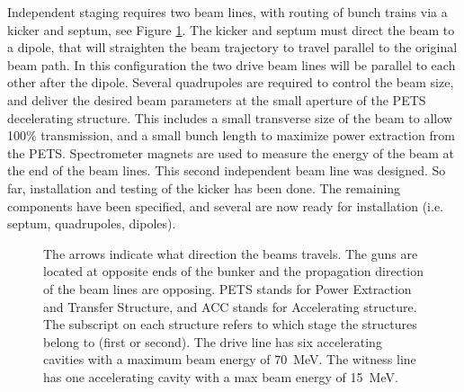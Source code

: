 


Independent staging requires two beam lines, with routing of bunch trains via a kicker and septum, 
see Figure \ref{fig:full-staging}. The kicker and septum must direct the beam to a dipole, 
that will straighten the beam trajectory to travel parallel to the original beam path. 
In this configuration the two drive beam lines will be parallel to each other after the dipole.
Several quadrupoles are required to control the beam size, and deliver the desired beam parameters
at the small aperture of the PETS decelerating structure. 
This includes a small transverse size of the beam to allow 100\% transmission, 
and a small bunch length to maximize power extraction from the PETS.
Spectrometer magnets are used to measure the energy of the beam at the end of the beam lines.
This second independent beam line was designed. So far, installation and testing of the kicker has been done.  
The remaining components have been specified, and several are now ready for installation (i.e. septum, quadrupoles, dipoles).
\begin{figure}
		\begin{center}
		\begin{tikzpicture}[scale=\textwidth/35cm, text=black]
		
		\end{tikzpicture}
	\end{center}
\caption{The arrows indicate what direction the beams travels.
	The guns are located at opposite ends of the bunker and 
	the propagation direction of the beam lines are opposing.
	PETS stands for Power Extraction and Transfer Structure, and ACC stands for Accelerating structure. 
	The subscript on each structure refers to which stage the structures belong to (first or second). 
	The drive line has six accelerating cavities with a maximum beam energy of \SI{70}{MeV}. 
	The witness line has one accelerating cavity with a max beam energy of \SI{15}{MeV}.}
\label{fig:full-staging}
\end{figure}

